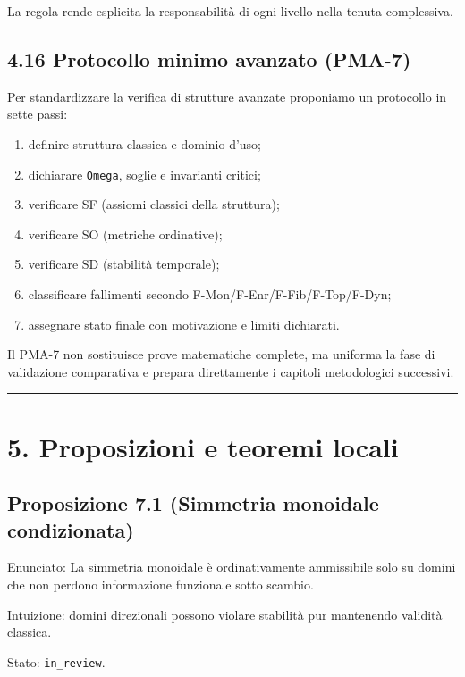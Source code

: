 La regola rende esplicita la responsabilità di ogni livello nella tenuta complessiva.

\subsection{4.16 Protocollo minimo avanzato (PMA-7)}

Per standardizzare la verifica di strutture avanzate proponiamo un protocollo in sette passi:

\begin{enumerate}
\def\labelenumi{\arabic{enumi}.}
\tightlist
\item
  definire struttura classica e dominio d'uso;
\item
  dichiarare \texttt{Omega}, soglie e invarianti critici;
\item
  verificare SF (assiomi classici della struttura);
\item
  verificare SO (metriche ordinative);
\item
  verificare SD (stabilità temporale);
\item
  classificare fallimenti secondo F-Mon/F-Enr/F-Fib/F-Top/F-Dyn;
\item
  assegnare stato finale con motivazione e limiti dichiarati.
\end{enumerate}

Il PMA-7 non sostituisce prove matematiche complete, ma uniforma la fase di validazione comparativa e prepara direttamente i capitoli metodologici successivi.

\begin{center}\rule{0.5\linewidth}{0.5pt}\end{center}

\section{5. Proposizioni e teoremi locali}

\subsection{Proposizione 7.1 (Simmetria monoidale condizionata)}

Enunciato:
La simmetria monoidale è ordinativamente ammissibile solo su domini che non perdono informazione funzionale sotto scambio.

Intuizione:
domini direzionali possono violare stabilità pur mantenendo validità classica.

Stato: \texttt{in\_review}.

